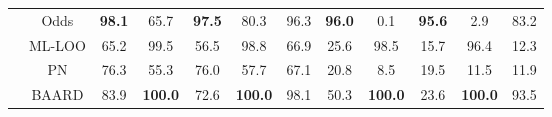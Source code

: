 \documentclass[varwidth=\maxdimen]{standalone}
\begin{document}
\begin{table}
\begin{tabular}{@{\hskip2pt}c@{\hskip2pt}|c|ccccc|ccccc}
                                                   & Odds                                  & \textbf{98.1}                    & 65.7                              & \textbf{97.5}           & 80.3                             & 96.3                           & \textbf{96.0}           & 0.1              & \textbf{95.6}     & 2.9              & 83.2              \\
                                                   & ML-LOO                                & 65.2                             & 99.5                              & {\color{red}56.5}       & 98.8                             & 66.9                           & 25.6                    & 98.5             & 15.7              & 96.4             & 12.3              \\
                                                   & PN                                    & 76.3                             & 55.3                              & 76.0                    & 57.7                             & 67.1                           & 20.8                    & 8.5              & 19.5              & 11.5             & 11.9              \\
                                                   & BAARD                                 & 83.9                             & \textbf{100.0}                    & 72.6                    & \textbf{100.0}                   & 98.1                           & 50.3                    & \textbf{100.0}   & 23.6              & \textbf{100.0}   & 93.5              \\


\end{tabular}
\end{table}
\end{document}
